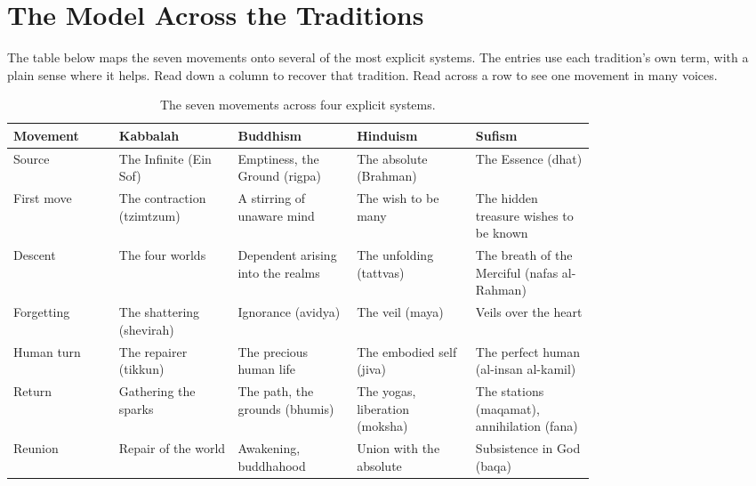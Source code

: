 \section{The Model Across the Traditions}

The table below maps the seven movements onto several of the most explicit systems. The entries use each
tradition's own term, with a plain sense where it helps. Read down a column to recover that tradition. Read
across a row to see one movement in many voices.

{\small
\begin{longtable}{L{0.135\linewidth} L{0.155\linewidth} L{0.155\linewidth} L{0.155\linewidth} L{0.155\linewidth}}
\caption{The seven movements across four explicit systems.}\\
\toprule
\textbf{Movement} & \textbf{Kabbalah} & \textbf{Buddhism} & \textbf{Hinduism} & \textbf{Sufism} \\
\midrule
Source & The Infinite (Ein Sof) & Emptiness, the Ground (rigpa) & The absolute (Brahman) & The Essence (dhat) \\
First move & The contraction (tzimtzum) & A stirring of unaware mind & The wish to be many & The hidden treasure wishes to be known \\
Descent & The four worlds & Dependent arising into the realms & The unfolding (tattvas) & The breath of the Merciful (nafas al-Rahman) \\
Forgetting & The shattering (shevirah) & Ignorance (avidya) & The veil (maya) & Veils over the heart \\
Human turn & The repairer (tikkun) & The precious human life & The embodied self (jiva) & The perfect human (al-insan al-kamil) \\
Return & Gathering the sparks & The path, the grounds (bhumis) & The yogas, liberation (moksha) & The stations (maqamat), annihilation (fana) \\
Reunion & Repair of the world & Awakening, buddhahood & Union with the absolute & Subsistence in God (baqa) \\
\bottomrule
\end{longtable}
}

